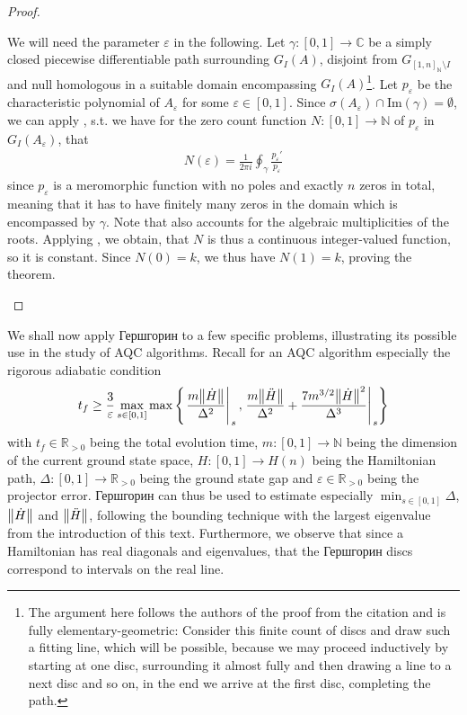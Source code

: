 \documentclass[10pt]{amsart}
\theoremstyle{definition}
\theoremstyle{remark}
\newcommand{\evalat}[2]{\left.{#1}\middle|\right._{#2}}
\begin{document}
\begin{proof}
\begin{enumerate}[wide]
            We will need the parameter \(\varepsilon\) in the following. Let \(\gamma\colon [0, 1] \to \mathbb{C}\) be a simply closed piecewise differentiable path surrounding \(G_I(A)\), disjoint from \(G_{[1, n]_{\mathbb{N}} \setminus I}\) and null homologous in a suitable domain encompassing \(G_I(A)\)\footnote{The argument here follows the authors of the proof from the citation and is fully elementary-geometric: Consider this finite count of discs and draw such a fitting line, which will be possible, because we may proceed inductively by starting at one disc, surrounding it almost fully and then drawing a line to a next disc and so on, in the end we arrive at the first disc, completing the path.}. Let \(p_\varepsilon\) be the characteristic polynomial of \(A_\varepsilon\) for some \(\varepsilon \in [0, 1]\). Since \(\sigma(A_\varepsilon) \cap \text{Im}(\gamma) = \emptyset\), we can apply , s.t. we have for the zero count function \(N\colon [0, 1] \to \mathbb{N}\) of \(p_\varepsilon\) in \(G_I(A_\varepsilon)\), that
            \begin{align}
                N(\varepsilon) = \frac{1}{2 \pi i} \oint_\gamma \frac{p_\varepsilon'}{p_\varepsilon}
            \end{align}
            since \(p_\varepsilon\) is a meromorphic function with no poles and exactly \(n\) zeros in total, meaning that it has to have finitely many zeros in the domain which is encompassed by \(\gamma\). Note that  also accounts for the algebraic multiplicities of the roots. Applying , we obtain, that \(N\) is thus a continuous integer-valued function, so it is constant. Since \(N(0) = k\), we thus have \(N(1) = k\), proving the theorem.
        \end{enumerate}
    \end{proof}

    We shall now apply Гершгорин to a few specific problems, illustrating its possible use in the study of AQC algorithms. Recall for an AQC algorithm especially the rigorous adiabatic condition \cite[p. 7]{Albash}
    \begin{align}
        t_f \geq \frac{3}{\varepsilon}\max_{s \in [0, 1]} \max\left\{\evalat{\frac{m\norm{\dot{H}}}{\Delta^2}}{s}, \evalat{\frac{m\norm{\ddot{H}}}{\Delta^2}+\frac{7m^{3/2}\norm{\dot{H}}^2}{\Delta^3}}{s}\right\}
    \end{align}
    with \(t_f \in \mathbb{R}_{> 0}\) being the total evolution time, \(m\colon [0, 1] \to \mathbb{N}\) being the dimension of the current ground state space, \(H\colon [0, 1] \to H(n)\) being the Hamiltonian path, \(\Delta\colon [0, 1] \to \mathbb{R}_{> 0}\) being the ground state gap and \(\varepsilon \in \mathbb{R}_{> 0}\) being the projector error. Гершгорин can thus be used to estimate especially \(\min_{s \in [0, 1]} \Delta\), \(\norm{\dot{H}}\) and \(\norm{\ddot{H}}\), following the bounding technique with the largest eigenvalue from the introduction of this text. Furthermore, we observe that since a Hamiltonian has real diagonals and eigenvalues, that the Гершгорин discs correspond to intervals on the real line.
\end{document}

